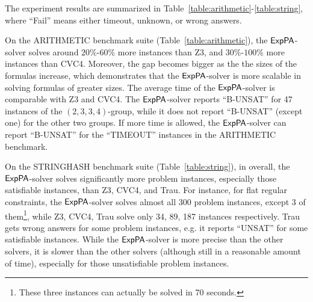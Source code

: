The experiment results are summarized in Table~\ref{table:arithmetic}-\ref{table:string}, where ``Fail'' means either timeout, unknown, or wrong answers. 

On the ARITHMETIC benchmark suite (Table~\ref{table:arithmetic}), the ${\sf ExpPA}$-solver solves around $20\%$-$60\%$ more instances than Z3, and $30\%$-$100\%$ more instances than CVC4. Moreover, the gap becomes bigger as the the sizes of the formulas increase, which demonstrates that the ${\sf ExpPA}$-solver is more scalable in solving formulas of greater sizes. The average time of the ${\sf ExpPA}$-solver is comparable with Z3 and CVC4. The ${\sf ExpPA}$-solver reports ``B-UNSAT'' for 47 instances of the $(2, 3, 3, 4)$-group, while it does not report ``B-UNSAT'' (except one) for the other two groups. If more time is allowed, the ${\sf ExpPA}$-solver can report ``B-UNSAT'' for the ``TIMEOUT'' instances in the ARITHMETIC benchmark. 



On the STRINGHASH benchmark suite (Table~\ref{table:string}), in overall, the ${\sf ExpPA}$-solver solves significantly more problem instances, especially those satisfiable instances, than Z3, CVC4, and Trau. For instance, for flat regular constraints, the ${\sf ExpPA}$-solver solves almost all 300 problem instances, except 3 of them\footnote{These three instances can actually be solved in 70 seconds.}, while  Z3, CVC4, Trau solve only 34, 89, 187 instances respectively.  Trau gets wrong answers for some problem instances, e.g. it reports ``UNSAT'' for some satisfiable instances. While the ${\sf ExpPA}$-solver is more precise than the other solvers, it is slower than the other solvers (although still in a reasonable amount of time), especially for those unsatisfiable problem instances.


%



